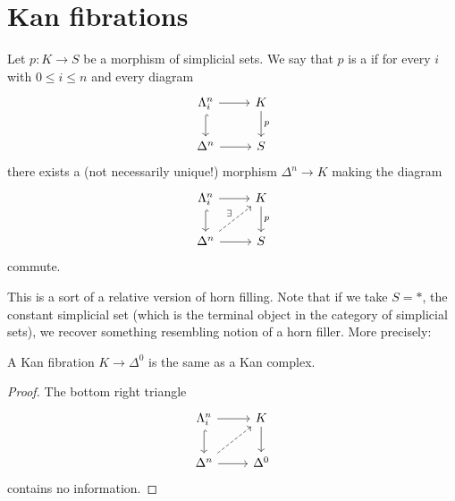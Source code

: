 \documentclass[main.tex]{subfiles}
\begin{document}
\section{Kan fibrations}
\label{sec:kan_fibrations}

\begin{definition}
  \label{def:kan_fibration}
  Let $p\colon K \to S$ be a morphism of simplicial sets. We say that $p$ is a  if for every $i$ with $0 \leq i \leq n$ and every diagram
  \begin{equation*}
    \begin{tikzcd}
      \Lambda^{n}_{i}
      \arrow[r]
      \arrow[d, hookrightarrow]
      & K
      \arrow[d, "p"]
      \\
      \Delta^{n}
      \arrow[r]
      & S
    \end{tikzcd}
  \end{equation*}
  there exists a (not necessarily unique!) morphism $\Delta^{n} \to K$ making the diagram
  \begin{equation*}
    \begin{tikzcd}
      \Lambda^{n}_{i}
      \arrow[r]
      \arrow[d, hookrightarrow]
      & K
      \arrow[d, "p"]
      \\
      \Delta^{n}
      \arrow[ur, dashed, "\exists"]
      \arrow[r]
      & S
    \end{tikzcd}
  \end{equation*}
  commute.
\end{definition}

This is a sort of a relative version of horn filling. Note that if we take $S = *$, the constant simplicial set (which is the terminal object in the category of simplicial sets), we recover something resembling notion of a horn filler. More precisely:

\begin{corollary}
  \label{cor:kan_fibration_to_point_is_kan_complex}
  A Kan fibration $K \to \Delta^{0}$ is the same as a Kan complex.
\end{corollary}
\begin{proof}
  The bottom right triangle
  \begin{equation*}
    \begin{tikzcd}
      \Lambda^{n}_{i}
      \arrow[r]
      \arrow[d, hookrightarrow]
      & K
      \arrow[d]
      \\
      \Delta^{n}
      \arrow[ur, dashed]
      \arrow[r]
      & \Delta^{0}
    \end{tikzcd}
  \end{equation*}
  contains no information.
\end{proof}
\end{document}
